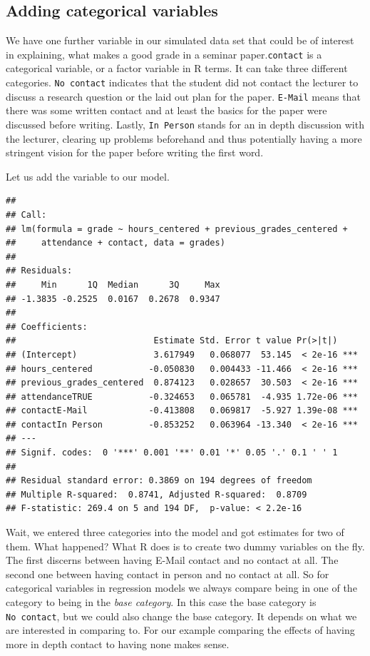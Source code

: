 \documentclass[
]{book}
\begin{document}
\hypertarget{adding-categorical-variables}{%
\subsection{Adding categorical variables}\label{adding-categorical-variables}}

We have one further variable in our simulated data set that could be of interest
in explaining, what makes a good grade in a seminar paper.\texttt{contact} is a
categorical variable, or a factor variable in R terms.
It can take three different categories. \texttt{No\ contact} indicates that
the student did not contact the lecturer to discuss a research question or the
laid out plan for the paper. \texttt{E-Mail} means that there was some written contact
and at least the basics for the paper were discussed before writing. Lastly,
\texttt{In\ Person} stands for an in depth discussion with the lecturer, clearing up
problems beforehand and thus potentially having a more stringent vision for the
paper before writing the first word.

Let us add the variable to our model.

\begin{verbatim}
## 
## Call:
## lm(formula = grade ~ hours_centered + previous_grades_centered + 
##     attendance + contact, data = grades)
## 
## Residuals:
##     Min      1Q  Median      3Q     Max 
## -1.3835 -0.2525  0.0167  0.2678  0.9347 
## 
## Coefficients:
##                           Estimate Std. Error t value Pr(>|t|)    
## (Intercept)               3.617949   0.068077  53.145  < 2e-16 ***
## hours_centered           -0.050830   0.004433 -11.466  < 2e-16 ***
## previous_grades_centered  0.874123   0.028657  30.503  < 2e-16 ***
## attendanceTRUE           -0.324653   0.065781  -4.935 1.72e-06 ***
## contactE-Mail            -0.413808   0.069817  -5.927 1.39e-08 ***
## contactIn Person         -0.853252   0.063964 -13.340  < 2e-16 ***
## ---
## Signif. codes:  0 '***' 0.001 '**' 0.01 '*' 0.05 '.' 0.1 ' ' 1
## 
## Residual standard error: 0.3869 on 194 degrees of freedom
## Multiple R-squared:  0.8741, Adjusted R-squared:  0.8709 
## F-statistic: 269.4 on 5 and 194 DF,  p-value: < 2.2e-16
\end{verbatim}

Wait, we entered three categories into the model and got estimates for two of
them. What happened? What R does is to create two dummy variables on the fly.
The first discerns between having E-Mail contact and no contact at all. The
second one between having contact in person and no contact at all. So for
categorical variables in regression models we always compare being in one of the
category to being in the \emph{base category}. In this case the base category is
\texttt{No\ contact}, but we could also change the base category. It depends on what we
are interested in comparing to. For our example comparing the effects of having
more in depth contact to having none makes sense.
\end{document}

